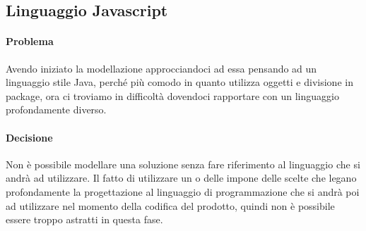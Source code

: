 \subsection{Linguaggio Javascript}
\paragraph{Problema}
Avendo iniziato la modellazione approcciandoci ad essa pensando ad un linguaggio stile Java, perché più comodo in quanto utilizza oggetti e divisione in package, ora ci troviamo in difficoltà dovendoci rapportare con un linguaggio profondamente diverso.
\paragraph{Decisione}
Non è possibile modellare una soluzione senza fare riferimento al linguaggio che si andrà ad utilizzare.
Il fatto di utilizzare un  o delle  impone delle scelte che legano profondamente la progettazione al linguaggio di programmazione che si andrà poi ad utilizzare nel momento della codifica del prodotto, quindi non è possibile essere troppo astratti in questa fase.

